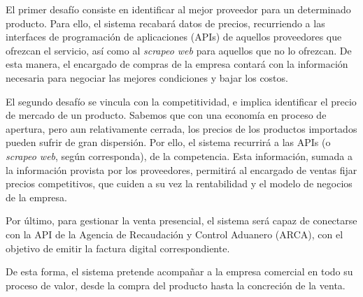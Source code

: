 El primer desafío consiste en identificar 
al mejor proveedor para un determinado producto.
Para ello,
el sistema recabará datos de precios,
recurriendo a las interfaces de programación de aplicaciones (APIs)
de aquellos proveedores que ofrezcan el servicio,
así como al \textit{scrapeo web} para aquellos que no lo ofrezcan.
De esta manera,
el encargado de compras de la empresa contará con la información necesaria para 
negociar las mejores condiciones y bajar los costos.

El segundo desafío se vincula con la competitividad,
e implica identificar el precio de mercado de un producto.
Sabemos que con una economía en proceso de apertura,
pero aun relativamente cerrada,
los precios de los productos importados pueden sufrir de gran dispersión.
Por ello,
el sistema recurrirá a las APIs (o \textit{scrapeo web}, según corresponda),
de la competencia.
Esta información,
sumada a la información provista por los proveedores,
permitirá al encargado de ventas fijar precios competitivos,
que cuiden a su vez la rentabilidad y el modelo de negocios de la empresa.

Por último,
para gestionar la venta presencial,
el sistema será capaz de conectarse con la 
API de la Agencia de Recaudación y Control Aduanero (ARCA),
con el objetivo de emitir la factura digital correspondiente.

De esta forma,
el sistema pretende acompañar a la empresa comercial en todo su proceso de valor,
desde la compra del producto hasta la concreción de la venta.